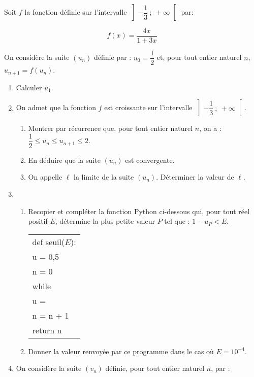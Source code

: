 
\medskip

Soit $f$ la fonction définie sur l'intervalle $\left]-\dfrac{1}{3}~;~+\infty\right[$ par:

\[ f(x) = \dfrac{4x}{1 + 3x}\]

On considère la suite $\left(u_n\right)$ définie par : $u_0 = \dfrac{1}{2}$ et, pour tout entier naturel $n$,\, $u_{n+1} = f\left(u_n\right)$.

\medskip

\begin{enumerate}
\item Calculer $u_1$.
\item On admet que la fonction $f$ est croissante sur l'intervalle $\left]-\dfrac{1}{3}~;~+\infty\right[$.
	\begin{enumerate}
		\item Montrer par récurrence que, pour tout entier naturel $n$, on a : $\dfrac{1}{2} \leqslant u_n \leqslant u_{n+1} \leqslant 2$.
		\item En déduire que la suite $\left(u_n\right)$ est convergente.
		\item On appelle $\ell$ la limite de la suite $\left(u_n\right)$. Déterminer la valeur de $\ell$.
	\end{enumerate}
\item 
	\begin{enumerate}
		\item Recopier et compléter la fonction Python ci-dessous qui, pour tout réel positif $E$, détermine la plus petite valeur $P$ tel que : $1 - u_{P} < E$.
		
\begin{center}
\begin{tabularx}{0.4\linewidth}{|X|}\hline
def seuil($E$):\\
\quad u = 0,5\\
\quad n = 0 \\
\quad  while \dotfill\\
\quad \quad u = \dotfill\\
\quad \quad n = n + 1\\
\quad return n\\ \hline
\end{tabularx}
\end{center}
		\item Donner la valeur renvoyée par ce programme dans le cas où $E= 10^{-4}$.
	\end{enumerate}
\item On considère la suite $\left(v_n\right)$ définie, pour tout entier naturel $n$, par :


\end{enumerate}
